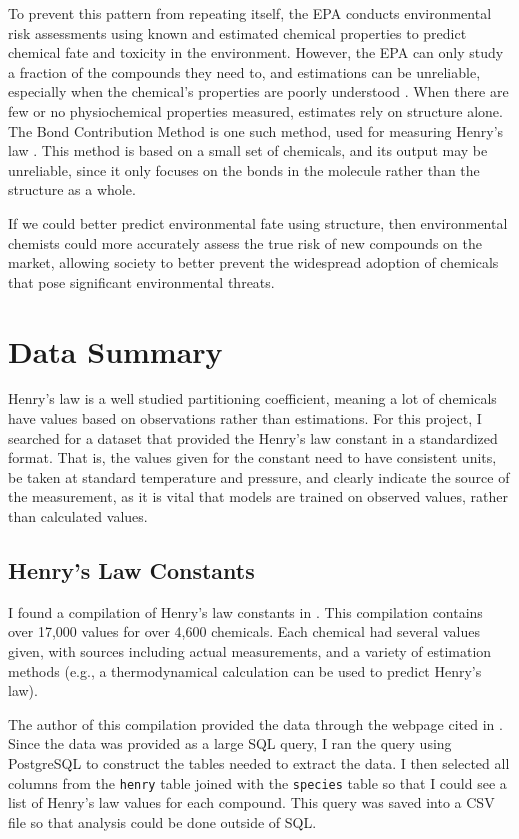 \documentclass[12pt, oneside]{article}   	%
\begin{document}
To prevent this pattern from repeating itself, the EPA conducts environmental risk assessments using known and estimated chemical properties to predict chemical fate and toxicity in the environment. However, the EPA can only  study a fraction of the compounds they need to, and estimations can be unreliable, especially when the chemical's properties are poorly understood \cite{burton}. When there are few or no physiochemical properties measured, estimates rely on structure alone. The Bond Contribution Method is one such method, used for measuring Henry's law \cite{meylan}. This method is based on a small set of chemicals, and its output may be unreliable, since it only focuses on the bonds in the molecule rather than the structure as a whole. 

If we could better predict environmental fate using structure, then environmental chemists could more accurately assess the true risk of new compounds on the market, allowing society to better prevent the widespread adoption of chemicals that pose significant environmental threats.

\section{Data Summary}
Henry's law is a well studied partitioning coefficient, meaning a lot of chemicals have values based on observations rather than estimations. For this project, I searched for a dataset that provided the Henry's law constant in a standardized format. That is, the values given for the constant need to have consistent units, be taken at standard temperature and pressure, and clearly indicate the source of the measurement, as it is vital that models are trained on observed values, rather than calculated values. 

\subsection{Henry's Law Constants}
I found a compilation of Henry's law constants in \cite{sander2015}. This compilation contains over 17,000 values for over 4,600 chemicals. Each chemical had several values given, with sources including actual measurements, and a variety of estimation methods (e.g., a thermodynamical calculation can be used to predict Henry's law). 

The author of this compilation provided the data through the webpage cited in \cite{sander-website}. Since the data was provided as a large SQL query, I ran the query using PostgreSQL to construct the tables needed to extract the data. I then selected all columns from  the \texttt{henry} table joined with the \texttt{species} table so that I could see a list of Henry's law values for each compound. This query was saved into a CSV file so that analysis could be done outside of SQL.
\end{document}

